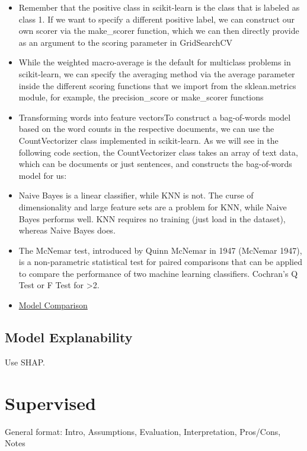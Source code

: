 \documentclass[]{book}
\begin{document}
\begin{itemize}
\item
  Remember that the positive class in scikit-learn is the class that is labeled as class 1. If we want to specify a different positive label, we can construct our own scorer via the make\_scorer function, which we can then directly provide as an argument to the scoring parameter in GridSearchCV
\item
  While the weighted macro-average is the default for multiclass problems in scikit-learn, we can specify the averaging method via the average parameter inside the different scoring functions that we import from the sklean.metrics module, for example, the precision\_score or make\_scorer functions
\item
  Transforming words into feature vectorsTo construct a bag-of-words model based on the word counts in the respective documents, we can use the CountVectorizer class implemented in scikit-learn. As we will see in the following code section, the CountVectorizer class takes an array of text data, which can be documents or just sentences, and constructs the bag-of-words model for us:
\item
  Naive Bayes is a linear classifier, while KNN is not. The curse of dimensionality and large feature sets are a problem for KNN, while Naive Bayes performs well. KNN requires no training (just load in the dataset), whereas Naive Bayes does.
\item
  The McNemar test, introduced by Quinn McNemar in 1947 (McNemar 1947), is a non-parametric statistical test for paired comparisons that can be applied to compare the performance of two machine learning classifiers. Cochran's Q Test or F Test for \textgreater{}2.
\item
  \href{http://hunch.net/?p=224}{Model Comparison}
\end{itemize}

\hypertarget{model-explanability}{%
\subsection{Model Explanability}\label{model-explanability}}

Use SHAP.

\hypertarget{supervised}{%
\section{Supervised}\label{supervised}}

General format: Intro, Assumptions, Evaluation, Interpretation, Pros/Cons, Notes
\end{document}
